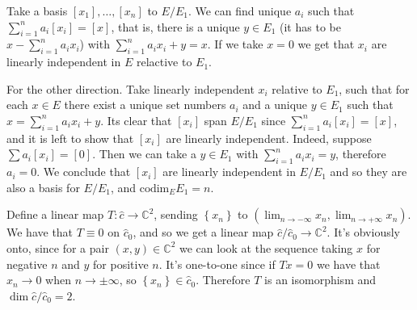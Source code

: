 \documentclass[11pt]{article} %
\begin{document}
\begin{Answer}
Take a basis $\left[ x_1 \right], \dots, \left[ x_n \right]$ to $E/E_1$. We can find unique $a_i$ such that $\sum_{i = 1}^{n}a_i\left[ x_i \right] = \left[ x \right]$, that is, there is a unique $y \in E_1$ (it has to be $x - \sum_{i = 1}^{n}a_{i}x_{i}$) with $\sum_{i = 1}^{n}a_i x_i + y = x$. If we take $x = 0$ we get that $x_i$ are linearly independent in $E$ relactive to $E_1$.

For the other direction. Take linearly independent $x_i$ relative to $E_1$, such that for each $x\in E$ there exist a unique set numbers $a_i$ and a unique $y \in E_1$ such that $x = \sum_{i = 1}^{n} a_i x_i + y$.  Its clear that $\left[ x_i \right]$ span $E/E_1$ since $\sum_{i = 1}^{n} a_i \left[x_i \right] = \left[ x \right]$, and it is left to show that $\left[ x_i \right]$ are linearly independent. Indeed, suppose $\sum a_i \left[ x_i \right] = \left[ 0 \right]$. Then we can take a $y \in E_1$ with $\sum_{i = 1}^{n} a_i x_i = y$, therefore $a_i = 0$. We conclude that $\left[ x_i \right]$ are linearly independent in $E/E_1$ and so they are also a basis for $E/E_1$, and $\text{codim}_{E}E_1 = n$.
\end{Answer}

\begin{Exercise}
\end{Exercise}

\begin{Answer}
Define a linear map $T: \hat{c} \to \mathbb{C}^2$, sending $\left\{x_n\right\}$ to $\left(\lim_{n\to -\infty} x_n, \lim_{n\to +\infty} x_n\right)$. We have that $T\equiv0$ on $\hat{c}_0$, and so we get a linear map $\hat{c} / \hat{c}_0 \to \mathbb{C}^2$. It's obviously onto, since for a pair $\left( x, y \right) \in \mathbb{C}^2$ we can look at the sequence taking $x$ for negative $n$ and $y$ for positive $n$. It's one-to-one since if $T x = 0$ we have that $ x_n \to 0 $ when $n \to \pm \infty $, so $\left\{ x_n \right\} \in \hat{c}_0$. Therefore $T$ is an isomorphism and $\dim \hat{c} / \hat{c}_0 = 2$.
\end{Answer}
\end{document}
